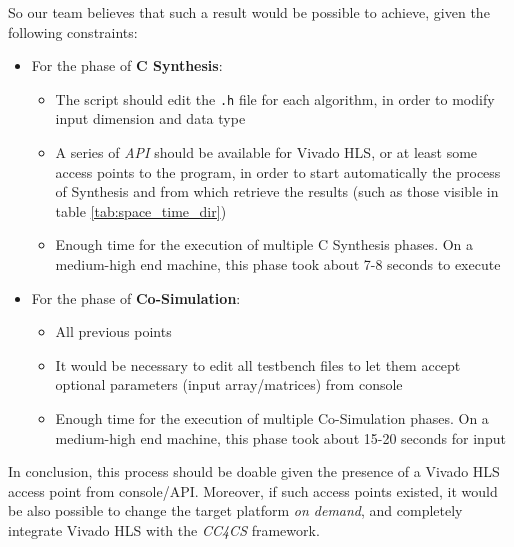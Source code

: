 So our team believes that such a result would be possible to achieve, given the following constraints:

\begin{itemize}
	\item For the phase of \textbf{C Synthesis}:
	\begin{itemize}
		\item The script should edit the \texttt{.h} file for each algorithm, in order to modify input dimension and data type
		\item A series of \emph{API} should be available for Vivado HLS, or at least some access points to the program, in order to start automatically the process of Synthesis and from which retrieve the results (such as those visible in table \ref{tab:space_time_dir})
		\item Enough time for the execution of multiple C Synthesis phases. On a medium-high end machine, this phase took about 7-8 seconds to execute
	\end{itemize}
	\item For the phase of \textbf{Co-Simulation}:
	\begin{itemize}
		\item All previous points
		\item It would be necessary to edit all testbench files to let them accept optional parameters (input array/matrices) from console
		\item Enough time for the execution of multiple Co-Simulation phases. On a medium-high end machine, this phase took about 15-20 seconds for input
	\end{itemize}
\end{itemize}

In conclusion, this process should be doable given the presence of a Vivado HLS access point from console/API. Moreover, if such access points existed, it would be also possible to change the target platform \textit{on demand}, and completely integrate Vivado HLS with the \textit{CC4CS} framework.